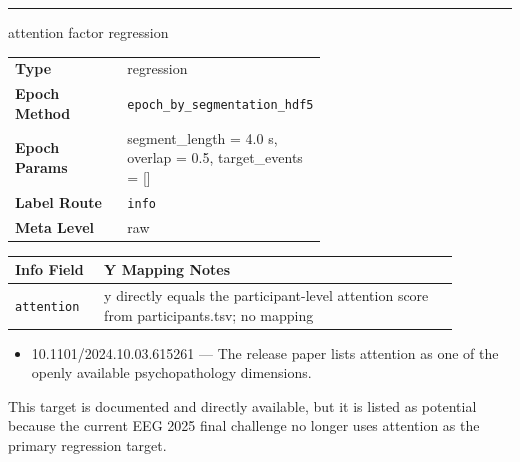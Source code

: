 {\begin{tcolorbox}
\noindent\rule{\linewidth}{0.4pt}\par\nopagebreak
{} {\footnotesize attention factor regression}\par\smallskip
{\footnotesize\begin{tabular}{@{}lp{0.62\linewidth}@{}}
\textbf{Type} & regression \\
\textbf{Epoch Method} & \texttt{epoch\_by\_segmentation\_hdf5} \\
\textbf{Epoch Params} & segment\_length = 4.0 s, overlap = 0.5, target\_events = [] \\
\textbf{Label Route} & \texttt{info} \\
\textbf{Meta Level} & raw \\
\end{tabular}}
\par{}\par\smallskip
\begingroup\footnotesize
\begin{tabular}{@{}p{0.1760\linewidth}p{0.7040\linewidth}@{}}
\toprule
\textbf{Info Field} & \textbf{Y Mapping Notes} \\
\midrule
\texttt{attention} & y directly equals the participant-level attention score from participants.tsv; no mapping \\
\bottomrule
\end{tabular}
\endgroup
\par{}\par
\begin{itemize}[leftmargin=1.3em,noitemsep,topsep=1pt]
\item[\scriptsize$\cdot$] {\scriptsize 10.1101/2024.10.03.615261 --- The release paper lists attention as one of the openly available psychopathology dimensions.}
\end{itemize}
\par{} {\footnotesize This target is documented and directly available, but it is listed as potential because the current EEG 2025 final challenge no longer uses attention as the primary regression target.}
\par\smallskip
\end{tcolorbox}
\vspace{3pt}
\noindent\begin{tcolorbox}[breakable,enhanced,colback=white,colframe=gray!55,boxrule=0.9pt,arc=4pt,left=6pt,right=6pt,top=4pt,bottom=4pt,title={\small\bfseries EEG During Mental Arithmetic Task\hfill \colorbox{gray!20}{\scriptsize\sffamily\bfseries Completed}},coltitle=black,colbacktitle=gray!12,titlerule=0.5pt]

\end{tcolorbox}}
